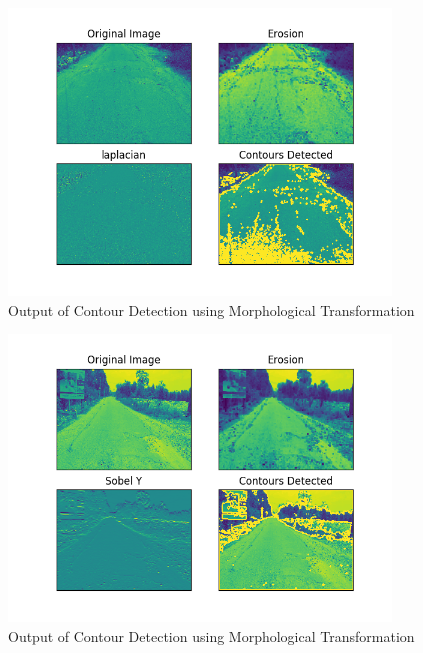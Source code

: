 \documentclass[12pt,a4paper]{article}
\begin{document}
\begin{itemize}
    \begin{figure}[ht!]
        \centering
        \includegraphics[width = 4in]{images/morph_transform_3.png}
        \caption{Output of Contour Detection using Morphological Transformation}
    \end{figure}
    

    \begin{figure}[ht!]
        \centering
        \includegraphics[width = 4in]{images/morph_transform_4.png}
        \caption{Output of Contour Detection using Morphological Transformation}
    \end{figure}

\newpage




\end{itemize}
\end{document}
